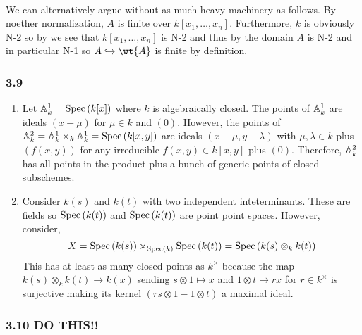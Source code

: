 \documentclass[12pt]{article}
\begin{document}
\bigskip\\
We can alternatively argue without as much heavy machinery as follows. By noether normalization, $A$ is finite over $k[x_1, \dots, x_n]$. Furthermore, $k$ is obviously N-2 so by  we see that $k[x_1, \dots, x_n]$ is N-2 and thus by  the domain $A$ is N-2 and in particular N-1 so $A \embed \wt{A}$ is finite by definition.

\subsubsection{3.9}

\begin{enumerate}
\item Let $\mathbb{A}^1_k = \mathrm{Spec}\left( k[x] \right)$ where $k$ is algebraically closed. The points of $\mathbb{A}^1_k$ are ideals $(x - \mu)$ for $\mu \in k$ and $(0)$. However, the points of $\mathbb{A}^2_k = \mathbb{A}^1_k \times_k \mathbb{A}^1_k = \mathrm{Spec}\left( k[x,y] \right)$ are ideals $(x - \mu, y - \lambda)$ with $\mu, \lambda \in k$ plus $(f(x,y))$ for any irreducible $f(x,y) \in k[x,y]$ plus $(0)$. Therefore, $\mathbb{A}^2_k$ has all points in the product plus a bunch of generic points of closed subschemes.

\item Consider $k(s)$ and $k(t)$ with two independent inteterminants. These are fields so $\mathrm{Spec}\left( k(t) \right)$ and $\mathrm{Spec}\left( k(t) \right)$ are point point spaces. However, consider,
\[ X = \mathrm{Spec}\left( k(s) \right) \times_{\mathrm{Spec}\left( k \right)} \mathrm{Spec}\left( k(t) \right) = \mathrm{Spec}\left( k(s) \otimes_k k(t) \right) \]
This has at least as many closed points as $k^\times$ because the map $k(s) \otimes_k k(t) \to k(x)$ sending $s \otimes 1 \mapsto x$ and $1 \otimes t \mapsto r x$ for $r \in k^\times$ is surjective making its kernel $(rs \otimes 1 - 1 \otimes t)$  a maximal ideal. 
\end{enumerate}

\subsubsection{3.10 DO THIS!!}
\end{document}
